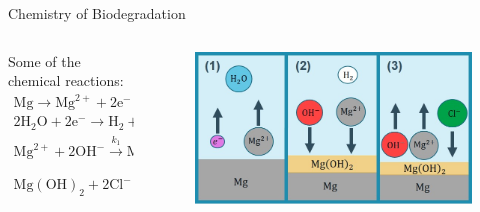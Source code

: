 \documentclass[11pt,t]{beamer}
\begin{document}
\begin{frame}[fragile]{Chemistry of Biodegradation}


	\begin{columns}[t]
		\begin{column}{.5\textwidth}
Some of the chemical reactions:
\begin{gather*}
\mathrm{Mg} \rightarrow \mathrm{Mg}^{2+}+2 \mathrm{e}^{-}
\end{gather*}
\begin{gather*}
2 \mathrm{H}_{2} \mathrm{O}+2 \mathrm{e}^{-} \rightarrow \mathrm{H}_{2}+2 \mathrm{OH}^{-}
\end{gather*}
\begin{gather*}
\mathrm{Mg}^{2+}+2 \mathrm{OH}^{-} \xrightarrow{k_1} \mathrm{Mg}(\mathrm{OH})_{2}
\end{gather*}
\begin{gather*}
\mathrm{Mg}(\mathrm{OH})_{2}+2\mathrm{Cl}^{-} \xrightarrow{k_2} \mathrm{Mg}^{2+} + 2\mathrm{Cl}^{-} + 2\mathrm{OH}^{-}
\end{gather*}
		\end{column}
		\begin{column}{.5\textwidth}

			\begin{figure}
			\centering
			\includegraphics[width=\textwidth]{chemistry}
			 
			\end{figure}
		\end{column}
	\end{columns}

\end{frame}
\end{document}
